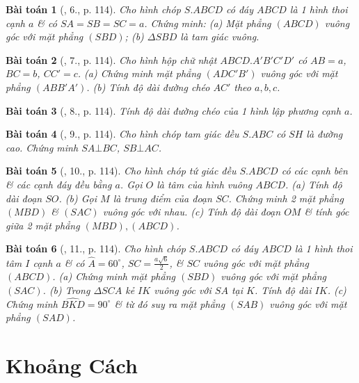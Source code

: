 \documentclass{article}
\numberwithin{equation}{section}
\newtheorem{baitoan}{Bài toán}
\begin{document}
\begin{baitoan}[\cite{SGK_Toan_11_hinh_hoc_co_ban}, 6., p. 114]
	Cho hình chóp $S.ABCD$ có đáy $ABCD$ là 1 hình thoi cạnh $a$ \& có $SA = SB = SC = a$. Chứng minh: (a) Mặt phẳng $(ABCD)$ vuông góc với mặt phẳng $(SBD)$; (b) $\Delta SBD$ là tam giác vuông.
\end{baitoan}

\begin{baitoan}[\cite{SGK_Toan_11_hinh_hoc_co_ban}, 7., p. 114]
	Cho hình hộp chữ nhật $ABCD.A'B'C'D'$ có $AB = a$, $BC = b$, $CC' = c$. (a) Chứng minh mặt phẳng $(ADC'B')$ vuông góc với mặt phẳng $(ABB'A')$. (b) Tính độ dài đường chéo $AC'$ theo $a,b,c$.
\end{baitoan}

\begin{baitoan}[\cite{SGK_Toan_11_hinh_hoc_co_ban}, 8., p. 114]
	Tính độ dài đường chéo của 1 hình lập phương cạnh $a$.
\end{baitoan}

\begin{baitoan}[\cite{SGK_Toan_11_hinh_hoc_co_ban}, 9., p. 114]
	Cho hình chóp tam giác đều $S.ABC$ có $SH$ là đường cao. Chứng minh $SA\bot BC$, $SB\bot AC$.
\end{baitoan}

\begin{baitoan}[\cite{SGK_Toan_11_hinh_hoc_co_ban}, 10., p. 114]
	Cho hình chóp tứ giác đều $S.ABCD$ có các cạnh bên \& các cạnh đáy đều bằng $a$. Gọi $O$ là tâm của hình vuông $ABCD$. (a) Tính độ dài đoạn $SO$. (b) Gọi $M$ là trung điểm của đoạn $SC$. Chứng minh 2 mặt phẳng $(MBD)$ \& $(SAC)$ vuông góc với nhau. (c) Tính độ dài đoạn $OM$ \& tính góc giữa 2 mặt phẳng $(MBD),(ABCD)$.
\end{baitoan}

\begin{baitoan}[\cite{SGK_Toan_11_hinh_hoc_co_ban}, 11., p. 114]
	Cho hình chóp $S.ABCD$ có đáy $ABCD$ là 1 hình thoi tâm $I$ cạnh $a$ \& có $\widehat{A} = 60^\circ$, $SC = \frac{a\sqrt{6}}{2}$, \& $SC$ vuông góc với mặt phẳng $(ABCD)$. (a) Chứng minh mặt phẳng $(SBD)$ vuông góc với mặt phẳng $(SAC)$. (b) Trong $\Delta SCA$ kẻ $IK$ vuông góc với $SA$ tại $K$. Tính độ dài $IK$. (c) Chứng minh $\widehat{BKD} = 90^\circ$ \& từ đó suy ra mặt phẳng $(SAB)$ vuông góc với mặt phẳng $(SAD)$.
\end{baitoan}


\section{Khoảng Cách}
\end{document}
